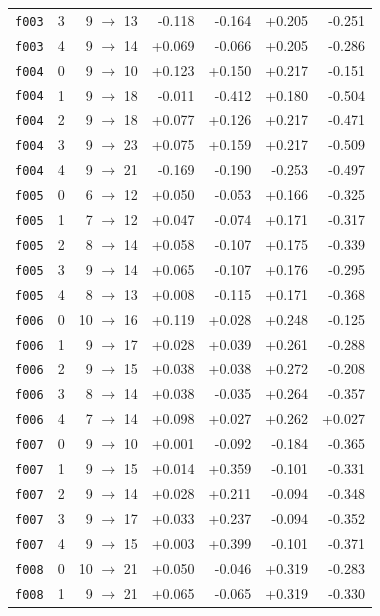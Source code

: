 \documentclass[11pt]{article}
\begin{document}
\begin{table}[htbp]
\begin{tabular}{llrrrrr}
\texttt{f003} & 3 & 9 $\to$ 13 & -0.118 & -0.164 & +0.205 & -0.251 \\
\texttt{f003} & 4 & 9 $\to$ 14 & +0.069 & -0.066 & +0.205 & -0.286 \\
\texttt{f004} & 0 & 9 $\to$ 10 & +0.123 & +0.150 & +0.217 & -0.151 \\
\texttt{f004} & 1 & 9 $\to$ 18 & -0.011 & -0.412 & +0.180 & -0.504 \\
\texttt{f004} & 2 & 9 $\to$ 18 & +0.077 & +0.126 & +0.217 & -0.471 \\
\texttt{f004} & 3 & 9 $\to$ 23 & +0.075 & +0.159 & +0.217 & -0.509 \\
\texttt{f004} & 4 & 9 $\to$ 21 & -0.169 & -0.190 & -0.253 & -0.497 \\
\texttt{f005} & 0 & 6 $\to$ 12 & +0.050 & -0.053 & +0.166 & -0.325 \\
\texttt{f005} & 1 & 7 $\to$ 12 & +0.047 & -0.074 & +0.171 & -0.317 \\
\texttt{f005} & 2 & 8 $\to$ 14 & +0.058 & -0.107 & +0.175 & -0.339 \\
\texttt{f005} & 3 & 9 $\to$ 14 & +0.065 & -0.107 & +0.176 & -0.295 \\
\texttt{f005} & 4 & 8 $\to$ 13 & +0.008 & -0.115 & +0.171 & -0.368 \\
\texttt{f006} & 0 & 10 $\to$ 16 & +0.119 & +0.028 & +0.248 & -0.125 \\
\texttt{f006} & 1 & 9 $\to$ 17 & +0.028 & +0.039 & +0.261 & -0.288 \\
\texttt{f006} & 2 & 9 $\to$ 15 & +0.038 & +0.038 & +0.272 & -0.208 \\
\texttt{f006} & 3 & 8 $\to$ 14 & +0.038 & -0.035 & +0.264 & -0.357 \\
\texttt{f006} & 4 & 7 $\to$ 14 & +0.098 & +0.027 & +0.262 & +0.027 \\
\texttt{f007} & 0 & 9 $\to$ 10 & +0.001 & -0.092 & -0.184 & -0.365 \\
\texttt{f007} & 1 & 9 $\to$ 15 & +0.014 & +0.359 & -0.101 & -0.331 \\
\texttt{f007} & 2 & 9 $\to$ 14 & +0.028 & +0.211 & -0.094 & -0.348 \\
\texttt{f007} & 3 & 9 $\to$ 17 & +0.033 & +0.237 & -0.094 & -0.352 \\
\texttt{f007} & 4 & 9 $\to$ 15 & +0.003 & +0.399 & -0.101 & -0.371 \\
\texttt{f008} & 0 & 10 $\to$ 21 & +0.050 & -0.046 & +0.319 & -0.283 \\
\texttt{f008} & 1 & 9 $\to$ 21 & +0.065 & -0.065 & +0.319 & -0.330 \\

\end{tabular}
\end{table}
\end{document}
